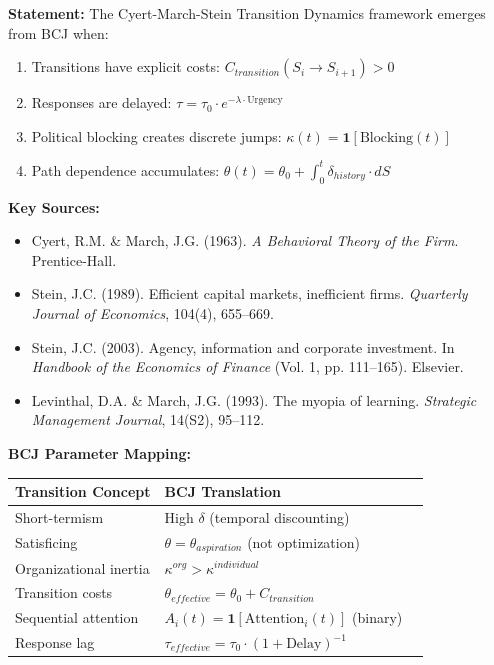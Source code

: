 \begin{tcolorbox}[colback=cyan!5!white, colframe=cyan!75!black,
    title=Theorem BCJ-T43: Time \& Transition Dynamics as Special Case]
\textbf{Statement:} The Cyert-March-Stein Transition Dynamics framework emerges from BCJ when:
\begin{enumerate}[nosep]
\item Transitions have explicit costs: $C_{transition}(S_i \to S_{i+1}) > 0$
\item Responses are delayed: $\tau = \tau_0 \cdot e^{-\lambda \cdot \text{Urgency}}$
\item Political blocking creates discrete jumps: $\kappa(t) = \mathbf{1}[\text{Blocking}(t)]$
\item Path dependence accumulates: $\theta(t) = \theta_0 + \int_0^t \delta_{history} \cdot dS$
\end{enumerate}

\textbf{Key Sources:}
\begin{itemize}[nosep]
\item Cyert, R.M. \& March, J.G. (1963). \textit{A Behavioral Theory of the Firm}. Prentice-Hall.
\item Stein, J.C. (1989). Efficient capital markets, inefficient firms. \textit{Quarterly Journal of Economics}, 104(4), 655--669.
\item Stein, J.C. (2003). Agency, information and corporate investment. In \textit{Handbook of the Economics of Finance} (Vol. 1, pp. 111--165). Elsevier.
\item Levinthal, D.A. \& March, J.G. (1993). The myopia of learning. \textit{Strategic Management Journal}, 14(S2), 95--112.
\end{itemize}

\textbf{BCJ Parameter Mapping:}
\begin{center}
\begin{tabular}{lll}
\toprule
\textbf{Transition Concept} & \textbf{BCJ Translation} \\
\midrule
Short-termism & High $\delta$ (temporal discounting) \\
Satisficing & $\theta = \theta_{aspiration}$ (not optimization) \\
Organizational inertia & $\kappa^{org} > \kappa^{individual}$ \\
Transition costs & $\theta_{effective} = \theta_0 + C_{transition}$ \\
Sequential attention & $A_i(t) = \mathbf{1}[\text{Attention}_i(t)]$ (binary) \\
Response lag & $\tau_{effective} = \tau_0 \cdot (1 + \text{Delay})^{-1}$ \\
\bottomrule
\end{tabular}
\end{center}


\end{tcolorbox}

